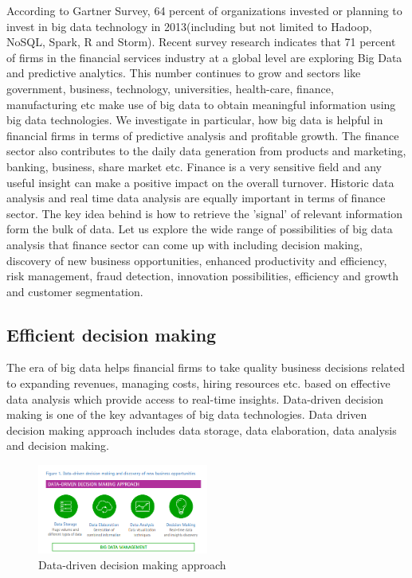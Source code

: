 \documentclass[sigconf]{acmart}
\begin{document}
According to Gartner Survey, 64 percent of organizations invested or planning to invest in big data technology in 2013(including but not limited to Hadoop, NoSQL, Spark, R and Storm)\cite{gartner-survey}. Recent survey research indicates that 71 percent of firms in the financial services
industry at a global level are exploring Big
Data and predictive analytics\cite{Accenture-Next-Generation-Financial}. This number continues to grow and sectors like government, business, technology, universities, health-care, finance, manufacturing etc make use of big data to obtain meaningful information using big data technologies\cite{/wiki/Big_data}. We investigate in particular, how big data is helpful in financial firms in terms of predictive analysis and profitable growth. The finance sector also contributes to the daily data generation from products and marketing, banking, business, share market etc. Finance is a very sensitive field and any useful insight can make a positive impact on the overall turnover. Historic data analysis and real time data analysis are equally important in terms of finance sector. The key idea behind is how to retrieve the 'signal' of relevant information form the bulk of data. Let us explore the wide range of possibilities of big data analysis that finance sector can come up with including decision making, discovery of new business opportunities, enhanced productivity and efficiency, risk management, fraud detection, innovation possibilities, efficiency and growth and customer segmentation.

\subsection{Efficient decision making}

The era of big data helps financial firms to take quality business decisions related to expanding revenues, managing costs, hiring resources etc. based on effective data analysis which provide access to real-time insights.  Data-driven decision making is one of the key advantages of big data technologies. Data driven decision making approach includes data storage, data elaboration, data analysis and decision making\cite{Accenture-Next-Generation-Financial}.

\begin{figure}
  \centering
  \includegraphics[width=0.5\textwidth]{images/Figure1.png}
  \caption{Data-driven decision making approach 
  \cite{Accenture-Next-Generation-Financial}} 
  \label{fig:Figure1} 
\end{figure}
\end{document}
